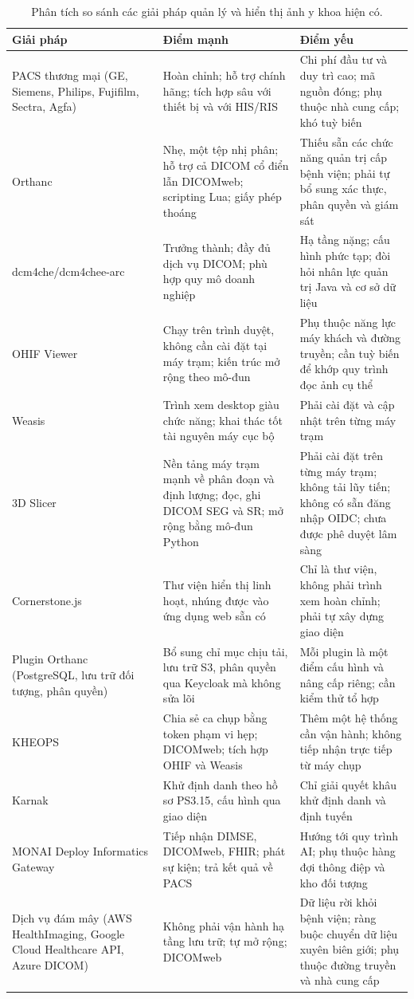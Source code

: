 \begin{table}[H]
\centering
\small
\begin{tabularx}{\textwidth}{@{}X X X@{}}
\toprule
\textbf{Giải pháp} & \textbf{Điểm mạnh} & \textbf{Điểm yếu} \\
\midrule
PACS thương mại (GE, Siemens, Philips, Fujifilm, Sectra, Agfa) & Hoàn chỉnh; hỗ trợ chính hãng; tích hợp sâu với thiết bị và với HIS/RIS & Chi phí đầu tư và duy trì cao; mã nguồn đóng; phụ thuộc nhà cung cấp; khó tuỳ biến \\
Orthanc & Nhẹ, một tệp nhị phân; hỗ trợ cả DICOM cổ điển lẫn DICOMweb; scripting Lua; giấy phép thoáng & Thiếu sẵn các chức năng quản trị cấp bệnh viện; phải tự bổ sung xác thực, phân quyền và giám sát \\
dcm4che/dcm4chee-arc & Trưởng thành; đầy đủ dịch vụ DICOM; phù hợp quy mô doanh nghiệp & Hạ tầng nặng; cấu hình phức tạp; đòi hỏi nhân lực quản trị Java và cơ sở dữ liệu \\
OHIF Viewer & Chạy trên trình duyệt, không cần cài đặt tại máy trạm; kiến trúc mở rộng theo mô-đun & Phụ thuộc năng lực máy khách và đường truyền; cần tuỳ biến để khớp quy trình đọc ảnh cụ thể \\
Weasis & Trình xem desktop giàu chức năng; khai thác tốt tài nguyên máy cục bộ & Phải cài đặt và cập nhật trên từng máy trạm \\
3D Slicer & Nền tảng máy trạm mạnh về phân đoạn và định lượng; đọc, ghi DICOM SEG và SR; mở rộng bằng mô-đun Python & Phải cài đặt trên từng máy trạm; không tải lũy tiến; không có sẵn đăng nhập OIDC; chưa được phê duyệt lâm sàng \\
Cornerstone.js & Thư viện hiển thị linh hoạt, nhúng được vào ứng dụng web sẵn có & Chỉ là thư viện, không phải trình xem hoàn chỉnh; phải tự xây dựng giao diện \\
Plugin Orthanc (PostgreSQL, lưu trữ đối tượng, phân quyền) & Bổ sung chỉ mục chịu tải, lưu trữ S3, phân quyền qua Keycloak mà không sửa lõi & Mỗi plugin là một điểm cấu hình và nâng cấp riêng; cần kiểm thử tổ hợp \\
KHEOPS & Chia sẻ ca chụp bằng token phạm vi hẹp; DICOMweb; tích hợp OHIF và Weasis & Thêm một hệ thống cần vận hành; không tiếp nhận trực tiếp từ máy chụp \\
Karnak & Khử định danh theo hồ sơ PS3.15, cấu hình qua giao diện & Chỉ giải quyết khâu khử định danh và định tuyến \\
MONAI Deploy Informatics Gateway & Tiếp nhận DIMSE, DICOMweb, FHIR; phát sự kiện; trả kết quả về PACS & Hướng tới quy trình AI; phụ thuộc hàng đợi thông điệp và kho đối tượng \\
Dịch vụ đám mây (AWS HealthImaging, Google Cloud Healthcare API, Azure DICOM) & Không phải vận hành hạ tầng lưu trữ; tự mở rộng; DICOMweb & Dữ liệu rời khỏi bệnh viện; ràng buộc chuyển dữ liệu xuyên biên giới; phụ thuộc đường truyền và nhà cung cấp \\
\bottomrule
\end{tabularx}
\caption{Phân tích so sánh các giải pháp quản lý và hiển thị ảnh y khoa hiện có.}
\label{tab:solutions}
\end{table}
